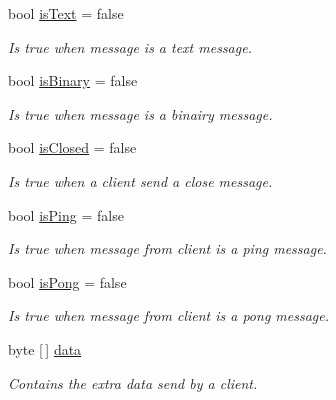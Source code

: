 \begin{DoxyCompactItemize}
\item 
bool \mbox{\hyperlink{class_simple_web_socket_server_library_1_1_web_socket_message_container_a0d340c630f9f0aa968c3ab769d123a08}{is\+Text}} = false
\begin{DoxyCompactList}\small\item\em Is true when message is a text message. \end{DoxyCompactList}\item 
bool \mbox{\hyperlink{class_simple_web_socket_server_library_1_1_web_socket_message_container_ae755138482b14a3fdc1003c8d89b9925}{is\+Binary}} = false
\begin{DoxyCompactList}\small\item\em Is true when message is a binairy message. \end{DoxyCompactList}\item 
bool \mbox{\hyperlink{class_simple_web_socket_server_library_1_1_web_socket_message_container_af110b8e8a38b3f8b025abcc403b5074a}{is\+Closed}} = false
\begin{DoxyCompactList}\small\item\em Is true when a client send a close message. \end{DoxyCompactList}\item 
bool \mbox{\hyperlink{class_simple_web_socket_server_library_1_1_web_socket_message_container_af5408cb3e61e53ae6a428f4a7fc50b9d}{is\+Ping}} = false
\begin{DoxyCompactList}\small\item\em Is true when message from client is a ping message. \end{DoxyCompactList}\item 
bool \mbox{\hyperlink{class_simple_web_socket_server_library_1_1_web_socket_message_container_a6cf131e019a37135d6054cd8101b8e5a}{is\+Pong}} = false
\begin{DoxyCompactList}\small\item\em Is true when message from client is a pong message. \end{DoxyCompactList}\item 
byte \mbox{[}$\,$\mbox{]} \mbox{\hyperlink{class_simple_web_socket_server_library_1_1_web_socket_message_container_a9c3e49f9275fadc3dc02c9d58ae65457}{data}}
\begin{DoxyCompactList}\small\item\em Contains the extra data send by a client. \end{DoxyCompactList}\end{DoxyCompactItemize}


